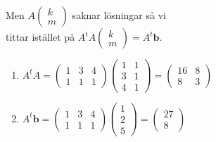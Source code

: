 Men $A\begin{pmatrix}k\\m\end{pmatrix}$ saknar lösningar så vi\\ tittar istället på $A^{t}A\begin{pmatrix}k\\m\end{pmatrix}=A^{t}\bm{b}$.
\begin{enumerate}
    \item[] 
        $A^{t}A=\begin{pmatrix}
            1&3&4\\
            1&1&1
        \end{pmatrix}
        \begin{pmatrix}
            1&1\\
            3&1\\
            4&1
        \end{pmatrix}
        =
        \begin{pmatrix}
            16&8\\
            8&3
        \end{pmatrix}$
    \item[] 
        $A^{t}\bm{b}=
        \begin{pmatrix}
            1&3&4\\
            1&1&1
        \end{pmatrix}
        \begin{pmatrix}
            1\\2\\5
        \end{pmatrix}
        =
        \begin{pmatrix}
            27\\8
        \end{pmatrix}$ 
\end{enumerate}
